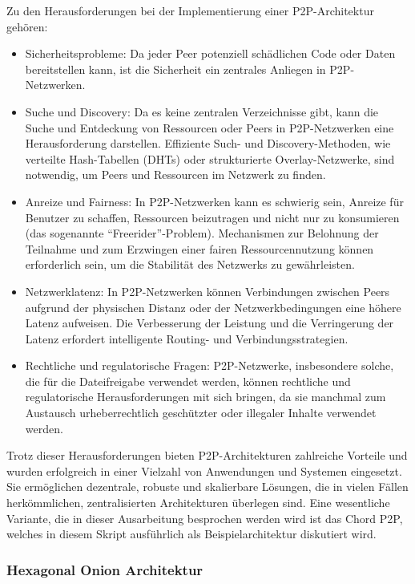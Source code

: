 \documentclass[../vs-script-first-v01.tex]{subfiles}
\begin{document}
Zu den Herausforderungen bei der Implementierung einer P2P-Architektur gehören:
\begin{itemize}
\item Sicherheitsprobleme: Da jeder Peer potenziell schädlichen Code oder Daten bereitstellen kann, ist die Sicherheit ein zentrales Anliegen in P2P-Netzwerken.
\item Suche und Discovery: Da es keine zentralen Verzeichnisse gibt, kann die Suche und Entdeckung von Ressourcen oder Peers in P2P-Netzwerken eine Herausforderung darstellen. Effiziente Such- und Discovery-Methoden, wie verteilte Hash-Tabellen (DHTs) oder strukturierte Overlay-Netzwerke, sind notwendig, um Peers und Ressourcen im Netzwerk zu finden.
\item Anreize und Fairness: In P2P-Netzwerken kann es schwierig sein, Anreize für Benutzer zu schaffen, Ressourcen beizutragen und nicht nur zu konsumieren (das sogenannte \enquote{Freerider}-Problem). Mechanismen zur Belohnung der Teilnahme und zum Erzwingen einer fairen Ressourcennutzung können erforderlich sein, um die Stabilität des Netzwerks zu gewährleisten.
\item Netzwerklatenz: In P2P-Netzwerken können Verbindungen zwischen Peers aufgrund der physischen Distanz oder der Netzwerkbedingungen eine höhere Latenz aufweisen. Die Verbesserung der Leistung und die Verringerung der Latenz erfordert intelligente Routing- und Verbindungsstrategien.
\item Rechtliche und regulatorische Fragen: P2P-Netzwerke, insbesondere solche, die für die Dateifreigabe verwendet werden, können rechtliche und regulatorische Herausforderungen mit sich bringen, da sie manchmal zum Austausch urheberrechtlich geschützter oder illegaler Inhalte verwendet werden.   
\end{itemize}
Trotz dieser Herausforderungen bieten P2P-Architekturen zahlreiche Vorteile und wurden erfolgreich in einer Vielzahl von Anwendungen und Systemen eingesetzt. Sie ermöglichen dezentrale, robuste und skalierbare Lösungen, die in vielen Fällen herkömmlichen, zentralisierten Architekturen überlegen sind. Eine wesentliche Variante, die in dieser Ausarbeitung besprochen werden wird ist das Chord P2P, welches in diesem Skript ausführlich als Beispielarchitektur diskutiert wird. 

\subsubsection{Hexagonal Onion Architektur}
\end{document}
